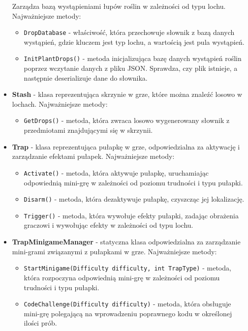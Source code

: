 \begin{itemize}
        Zarządza bazą wystąpieniami łupów roślin w zależności od typu lochu. Najważniejsze metody:
            \begin{itemize}
                \item \texttt{DropDatabase} - właściwość, która przechowuje słownik z bazą danych wystąpień, 
                gdzie kluczem jest typ lochu, a wartością jest pula wystąpień.
                \item \texttt{InitPlantDrops()} - metoda inicjalizująca bazę danych wystąpień roślin poprzez wczytanie danych z pliku JSON. 
                Sprawdza, czy plik istnieje, a następnie deserializuje dane do słownika.
            \end{itemize}
        \item \textbf{Stash} - klasa reprezentująca skrzynie w grze, które można znaleźć losowo w lochach.
        Najważniejsze metody:
            \begin{itemize}
                \item \texttt{GetDrops()} - metoda, która zwraca losowo wygenerowany słownik z przedmiotami znajdującymi się w skrzynii.
            \end{itemize}
        \item \textbf{Trap} - klasa reprezentująca pułapkę w grze, odpowiedzialna za aktywację i zarządzanie efektami pułapek. 
        Najważniejsze metody:
            \begin{itemize}
                \item \texttt{Activate()} - metoda, która aktywuje pułapkę, uruchamiając odpowiednią mini-grę w zależności od poziomu trudności i typu pułapki.
                \item \texttt{Disarm()} - metoda, która dezaktywuje pułapkę, czyszcząc jej lokalizację.
                \item \texttt{Trigger()} - metoda, która wywołuje efekty pułapki, zadając obrażenia graczowi i wywołując efekty w zależności od typu lochu.
            \end{itemize}
        \item \textbf{TrapMinigameManager} - statyczna klasa odpowiedzialna za zarządzanie mini-grami związanymi z pułapkami w grze. 
        Najważniejsze metody:
            \begin{itemize}
                \item \texttt{StartMinigame(Difficulty difficulty, int TrapType)} - metoda, która rozpoczyna odpowiednią mini-grę w zależności od poziomu trudności i typu pułapki.
                \item \texttt{CodeChallenge(Difficulty difficulty)} - metoda, która obsługuje mini-grę polegającą na wprowadzeniu poprawnego kodu w określonej ilości prób.

\end{itemize}
\end{itemize}
